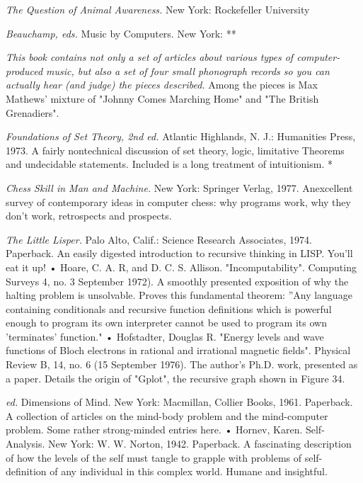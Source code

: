  {\sl The Question of Animal Awareness.} New York: Rockefeller University

 {\sl Beauchamp, eds.} Music by Computers. New York: **

 {\sl This book contains not only a set of articles about various types of computer-produced music, but also a set of four small phonograph records so you can actually hear (and judge) the pieces described.} Among the pieces is Max Mathews' mixture of "Johnny Comes Marching Home" and "The British Grenadiers".

 {\sl Foundations of Set Theory, 2nd ed.} Atlantic Highlands, N. J.: Humanities Press, 1973. A fairly nontechnical discussion of set theory, logic, limitative Theorems and undecidable statements. Included is a long treatment of intuitionism. *

 {\sl Chess Skill in Man and Machine.} New York: Springer Verlag, 1977. Anexcellent survey of contemporary ideas in computer chess: why programs work, why they don't work, retrospects and prospects.

 {\sl The Little Lisper.} Palo Alto, Calif.: Science Research Associates, 1974. Paperback. An easily digested introduction to recursive thinking in LISP. You'll eat it up! • Hoare, C. A. R, and D. C. S. Allison. "Incomputability". Computing Surveys 4, no. 3 September 1972). A smoothly presented exposition of why the halting problem is unsolvable. Proves this fundamental theorem: ''Any language containing conditionals and recursive function definitions which is powerful enough to program its own interpreter cannot be used to program its own 'terminates' function." • Hofstadter, Douglas R. "Energy levels and wave functions of Bloch electrons in rational and irrational magnetic fields". Physical Review B, 14, no. 6 (15 September 1976). The author's Ph.D. work, presented as a paper. Details the origin of "Gplot", the recursive graph shown in Figure 34.

 {\sl ed.} Dimensions of Mind. New York: Macmillan, Collier Books, 1961. Paperback. A collection of articles on the mind-body problem and the mind-computer problem. Some rather strong-minded entries here. • Hornev, Karen. Self-Analysis. New York: W. W. Norton, 1942. Paperback. A fascinating description of how the levels of the self must tangle to grapple with problems of self-definition of any individual in this complex world. Humane and insightful.

